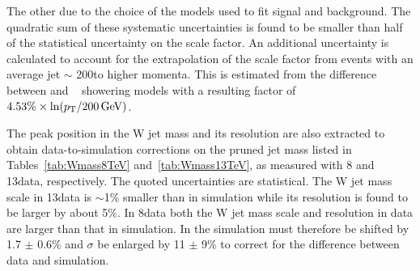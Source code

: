 The other due to the choice of the models used to fit signal and background.
The quadratic sum of these systematic uncertainties is found to be smaller than half of the statistical uncertainty on the scale factor. An additional uncertainty is calculated to account for the extrapolation of the scale factor from \ttbar events with an average jet \pt $\sim$ 200\GeV to higher momenta. This is estimated from the difference between  and \HERWIG{++}~\cite{Bahr:2008pv} showering models with a resulting factor of 
$4.53\% \times \displaystyle \ln(p_{\mathrm{T}}/200\,\text{Ge\hspace{-.08em}V})$.

The peak position in the W jet mass and its resolution are also extracted to obtain data-to-simulation corrections on the pruned jet mass listed in Tables~\ref{tab:Wmass8TeV} and~\ref{tab:Wmass13TeV}, as measured with 8 and 13\TeV data, respectively. The quoted uncertainties are statistical. The W jet mass scale in 13\TeV data is $\sim$1\% smaller than in simulation while its resolution is found to be larger by about 5\%. In 8\TeV data both the W jet mass scale and resolution in data are larger than that in simulation. In the simulation \mJ must therefore be shifted by 1.7 $\pm$ 0.6\% and $\sigma$ be enlarged by 11 $\pm$ 9\% to correct for the difference between data and simulation.

